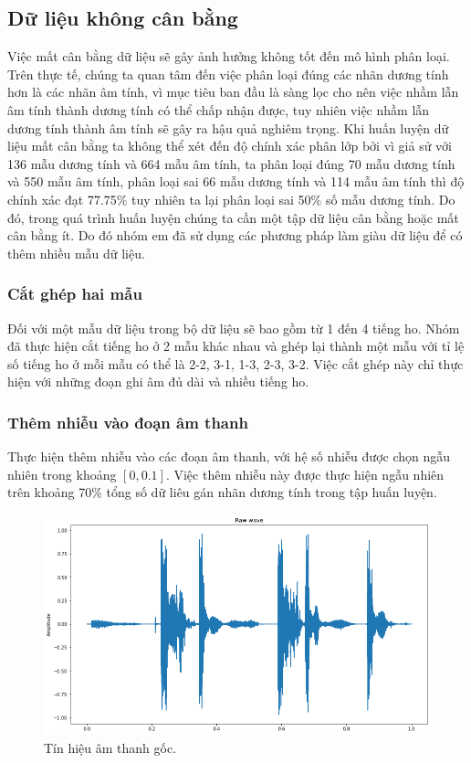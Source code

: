 \documentclass[a4paper, 12pt]{article}
\begin{document}
\subsection{Dữ liệu không cân bằng}
 Việc mất cân bằng dữ liệu sẽ gây ảnh hưởng không tốt đến mô hình phân loại. Trên thực tế, chúng ta quan tâm đến việc phân loại đúng các nhãn dương tính hơn là các nhãn âm tính, vì mục tiêu ban đầu là sàng lọc cho nên việc nhầm lẫn âm tính thành dương tính có thể chấp nhận được, tuy nhiên việc nhầm lẫn dương tính thành âm tính sẽ gây ra hậu quả nghiêm trọng. Khi huấn luyện dữ liệu mất cân bằng ta không thể xét đến độ chính xác phân lớp bởi vì giả sử với 136 mẫu dương tính và 664 mẫu âm tính, ta phân loại đúng 70 mẫu dương tính và 550 mẫu âm tính, phân loại sai 66 mẫu dương tính và 114 mẫu âm tính thì độ chính xác đạt 77.75\% tuy nhiên ta lại phân loại sai 50\% số mẫu dương tính. Do đó, trong quá trình huấn luyện chúng ta cần một tập dữ liệu cân bằng hoặc mất cân bằng ít. Do đó nhóm em đã sử dụng các phương pháp làm giàu dữ liệu để có thêm nhiều mẫu dữ liệu.
 
 \subsubsection{Cắt ghép hai mẫu}
 Đối với một mẫu dữ liệu trong bộ dữ liệu sẽ bao gồm từ 1 đến 4 tiếng ho. Nhóm đã thực hiện cắt tiếng ho ở 2 mẫu khác nhau và ghép lại thành một mẫu với tỉ lệ số tiếng ho ở mỗi mẫu có thể là 2-2, 3-1, 1-3, 2-3, 3-2. Việc cắt ghép này  chỉ thực hiện với những đoạn ghi âm đủ dài và nhiều tiếng ho.
 
 \subsubsection{Thêm nhiễu vào đoạn âm thanh}
 Thực hiện thêm nhiễu vào các đoạn âm thanh, với hệ số nhiễu được chọn ngẫu nhiên trong khoảng $[0, 0.1]$. Việc thêm nhiễu này được thực hiện ngẫu nhiên trên khoảng 70\% tổng số dữ liêu gán nhãn dương tính trong tập huấn luyện.
 
\begin{figure}[!ht]
\captionsetup{width=0.8\textwidth}
\centering
\includegraphics[width=11.8cm]{images/3.1.png}
\caption{Tín hiệu âm thanh gốc.}
\end{figure}
 
\end{document}
